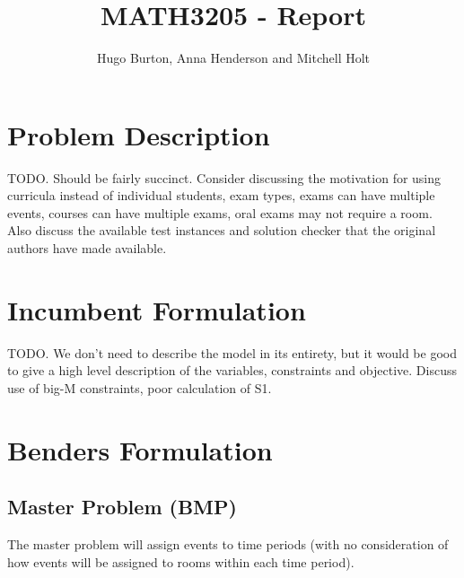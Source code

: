 \documentclass{article}
\title{MATH3205 - Report}
\author{Hugo Burton, Anna Henderson and Mitchell Holt}
\theoremstyle{plain}
\numberwithin{theorem}{section}
\numberwithin{example}{section}
\theoremstyle{definition}
\begin{document}
\maketitle

\tableofcontents

\newpage

\section{Problem Description}
TODO. Should be fairly succinct. Consider discussing the motivation for using
curricula instead of individual students, exam types, exams can have multiple
events, courses can have multiple exams, oral exams may not require a room. Also
discuss the available test instances and solution checker that the original
authors have made available.

\section{Incumbent Formulation}
TODO. We don't need to describe the model in its entirety, but it would be good
to give a high level description of the variables, constraints and objective.
Discuss use of big-M constraints, poor calculation of S1.

\section{Benders Formulation}
\subsection{Master Problem (BMP)}
The master problem will assign events to time periods (with no consideration of
how events will be assigned to rooms within each time period).
\end{document}
